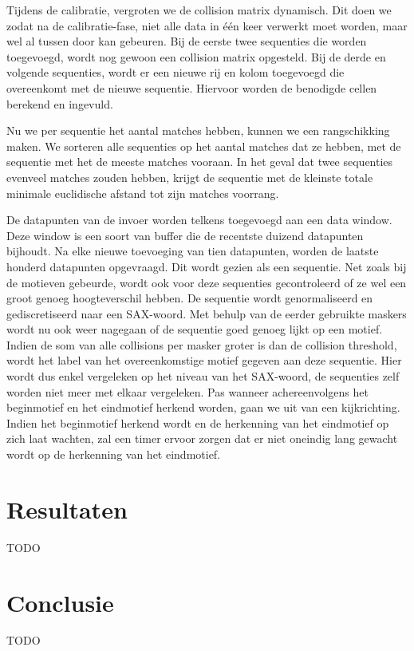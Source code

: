 \documentclass{article}
\begin{document}
Tijdens de calibratie, vergroten we de collision matrix dynamisch. Dit doen we zodat na de calibratie-fase, niet alle data in één keer verwerkt moet worden, maar wel al tussen door kan gebeuren. Bij de eerste twee sequenties die worden toegevoegd, wordt nog gewoon een collision matrix opgesteld. Bij de derde en volgende sequenties, wordt er een nieuwe rij en kolom toegevoegd die overeenkomt met de nieuwe sequentie. Hiervoor worden de benodigde cellen berekend en ingevuld.

Nu we per sequentie het aantal matches hebben, kunnen we een rangschikking maken. We sorteren alle sequenties op het aantal matches dat ze hebben, met de sequentie met het de meeste matches vooraan. In het geval dat twee sequenties evenveel matches zouden hebben, krijgt de sequentie met de kleinste totale minimale euclidische afstand tot zijn matches voorrang.

De datapunten van de invoer worden telkens toegevoegd aan een data window. Deze window is een soort van buffer die de recentste duizend datapunten bijhoudt. Na elke nieuwe toevoeging van tien datapunten, worden de laatste honderd datapunten opgevraagd. Dit wordt gezien als een sequentie. Net zoals bij de motieven gebeurde, wordt ook voor deze sequenties gecontroleerd of ze wel een groot genoeg hoogteverschil hebben. De sequentie wordt genormaliseerd en gediscretiseerd naar een SAX-woord. Met behulp van de eerder gebruikte maskers wordt nu ook weer nagegaan of de sequentie goed genoeg lijkt op een motief. Indien de som van alle collisions per masker groter is dan de collision threshold, wordt het label van het overeenkomstige motief gegeven aan deze sequentie. Hier wordt dus enkel vergeleken op het niveau van het SAX-woord, de sequenties zelf worden niet meer met elkaar vergeleken. Pas wanneer achereenvolgens het beginmotief en het eindmotief herkend worden, gaan we uit van een kijkrichting. Indien het beginmotief herkend wordt en de herkenning van het eindmotief op zich laat wachten, zal een timer ervoor zorgen dat er niet oneindig lang gewacht wordt op de herkenning van het eindmotief.


\section{Resultaten}
TODO

\section{Conclusie}
TODO
\end{document}
